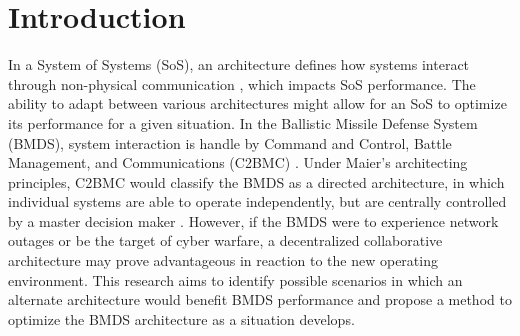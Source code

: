 \section{Introduction}

In a System of Systems (SoS), an architecture defines how systems interact through non-physical communication \cite{Maier1996}, which impacts SoS performance. The ability to adapt between various architectures might allow for an SoS to optimize its performance for a given situation. In the Ballistic Missile Defense System (BMDS), system interaction is handle by Command and Control, Battle Management, and Communications (C2BMC) \cite{MDA_C2BMC}. Under Maier's architecting principles, C2BMC would classify the BMDS as a directed architecture, in which individual systems are able to operate independently, but are centrally controlled by a master decision maker \cite{Maier1996}. However, if the BMDS were to experience network outages or be the target of cyber warfare, a decentralized collaborative architecture may prove advantageous in reaction to the new operating environment. This research aims to identify possible scenarios in which an alternate architecture would benefit BMDS performance and propose a method to optimize the BMDS architecture as a situation develops.